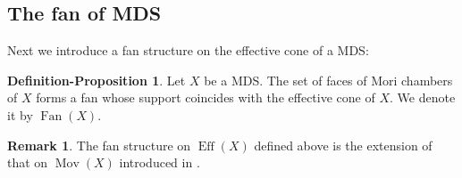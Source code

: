 \documentclass[12pt,twoside]{amsart}
\theoremstyle{definition}
\newtheorem{rem}[theo]{Remark}
\newtheorem{defi-prop}[theo]{Definition-Proposition}
\newcommand\Mov{\mathop{\mathrm{Mov}}\nolimits}
\newcommand\Eff{\mathop{\mathrm{Eff}}\nolimits}
\newcommand\Fan{\mathop{\mathrm{Fan}}}
\begin{document}
\subsection{The fan of MDS}\label{The fan of MDS}

Next we introduce a fan structure on the effective cone of a MDS:
\begin{defi-prop}\label{def of fan}
Let $X$ be a MDS. The set of faces of Mori chambers of $X$ forms a fan whose support coincides with
the effective cone of $X$. We denote it by $\Fan{(X)}$.
\end{defi-prop}
\begin{rem}
The fan structure on $\Eff{(X)}$ defined above is the extension of that on $\Mov{(X)}$
introduced in \cite[Proposition 1.11(3)]{hk}.
\end{rem}
\end{document}
